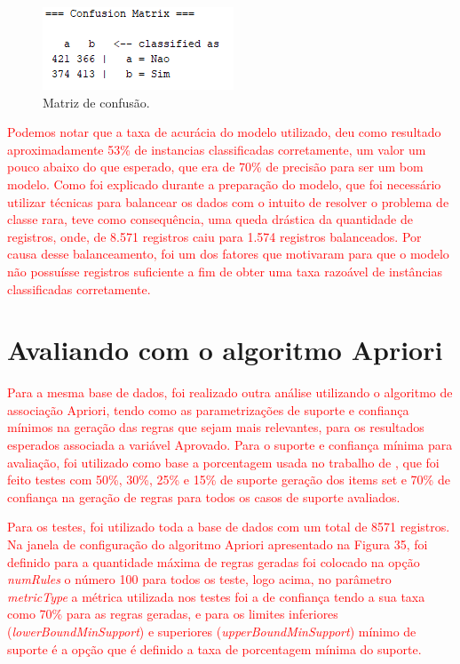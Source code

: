 \par
\begin{figure}[!htp]
	\begin{center}
    \caption{\label{fig:waveform_fig} Matriz de confusão.}
	\includegraphics[scale=0.99]{Figuras/Matriz_de_classificacao.png}
	\end{center}
\end{figure}

\par
\textcolor{red}{Podemos notar que a taxa de acurácia do modelo utilizado, deu como resultado aproximadamente 53\% de instancias classificadas corretamente, um valor um pouco abaixo do que esperado, que era de 70\% de precisão para ser um bom modelo. Como foi explicado durante a preparação do modelo, que foi necessário utilizar técnicas para balancear os dados com o intuito de resolver o problema de classe rara, teve como consequência, uma queda drástica da quantidade de registros, onde, de 8.571 registros caiu para 1.574 registros balanceados. Por causa desse balanceamento, foi um dos fatores que motivaram para que o modelo não possuísse registros suficiente a fim de obter uma taxa razoável  de instâncias classificadas corretamente.}



\section{Avaliando com o algoritmo Apriori}


\textcolor{red}{Para a mesma base de dados, foi realizado outra análise utilizando o algoritmo de associação Apriori, tendo como as parametrizações de suporte e confiança mínimos na geração das regras que sejam mais relevantes, para os resultados esperados associada a variável Aprovado. Para o suporte e confiança mínima para avaliação, foi utilizado como base a porcentagem usada no trabalho de , que foi feito testes com 50\%, 30\%, 25\% e 15\% de suporte geração dos items set e 70\% de confiança na geração de regras para todos os casos de suporte avaliados.}

\par
\textcolor{red}{Para os testes, foi utilizado toda a base de dados com um total de 8571 registros. Na janela de configuração do algoritmo Apriori apresentado na Figura 35, foi definido para a quantidade máxima de regras geradas foi colocado na opção \textit{numRules} o número 100 para todos os teste, logo acima, no parâmetro \textit{metricType} a métrica utilizada nos testes foi a de confiança tendo a sua taxa como 70\% para as regras geradas, e para os limites inferiores (\textit{lowerBoundMinSupport}) e superiores (\textit{upperBoundMinSupport}) mínimo de suporte é a opção que é definido a taxa de porcentagem mínima do suporte.}


